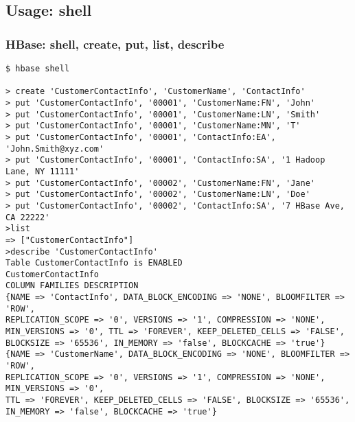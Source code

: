 \documentclass{beamer}
\begin{document}
\subsection{Usage: shell}
\begin{frame}[fragile]
 \frametitle{HBase: shell, create, put, list, describe}
{\color{mycolorcli}
  \begin{lstlisting}[frame=single, basicstyle=\tiny]
$ hbase shell

> create 'CustomerContactInfo', 'CustomerName', 'ContactInfo'
> put 'CustomerContactInfo', '00001', 'CustomerName:FN', 'John'
> put 'CustomerContactInfo', '00001', 'CustomerName:LN', 'Smith'
> put 'CustomerContactInfo', '00001', 'CustomerName:MN', 'T'
> put 'CustomerContactInfo', '00001', 'ContactInfo:EA', 'John.Smith@xyz.com'
> put 'CustomerContactInfo', '00001', 'ContactInfo:SA', '1 Hadoop Lane, NY 11111'
> put 'CustomerContactInfo', '00002', 'CustomerName:FN', 'Jane'
> put 'CustomerContactInfo', '00002', 'CustomerName:LN', 'Doe'
> put 'CustomerContactInfo', '00002', 'ContactInfo:SA', '7 HBase Ave, CA 22222'
>list
=> ["CustomerContactInfo"]
>describe 'CustomerContactInfo'
Table CustomerContactInfo is ENABLED
CustomerContactInfo
COLUMN FAMILIES DESCRIPTION                                     
{NAME => 'ContactInfo', DATA_BLOCK_ENCODING => 'NONE', BLOOMFILTER => 'ROW', 
REPLICATION_SCOPE => '0', VERSIONS => '1', COMPRESSION => 'NONE', 
MIN_VERSIONS => '0', TTL => 'FOREVER', KEEP_DELETED_CELLS => 'FALSE', 
BLOCKSIZE => '65536', IN_MEMORY => 'false', BLOCKCACHE => 'true'}           
{NAME => 'CustomerName', DATA_BLOCK_ENCODING => 'NONE', BLOOMFILTER => 'ROW', 
REPLICATION_SCOPE => '0', VERSIONS => '1', COMPRESSION => 'NONE', MIN_VERSIONS => '0', 
TTL => 'FOREVER', KEEP_DELETED_CELLS => 'FALSE', BLOCKSIZE => '65536', 
IN_MEMORY => 'false', BLOCKCACHE => 'true'}                                     
  \end{lstlisting}
}
\end{frame}
\end{document}
